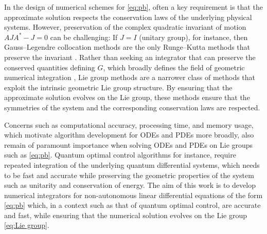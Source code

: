 \documentclass{article}
\begin{document}
%
In the design of numerical schemes for \eqref{eq:pb}, often a key requirement is that the approximate solution respects the conservation laws of the underlying physical systems.
%
However, preservation of the complex quadratic invariant of motion $AJA^\ast - J = 0$ can be challenging: If $J=I$ (unitary group), for instance, then Gauss--Legendre collocation methods are the only Runge--Kutta methods that preserve the invariant \cite{Dieci1994}. 
Rather than seeking an integrator that can preserve the conserved quantities defining $G$, which broadly defines the field of geometric numerical integration \cite{HLW:2006, BC:2017}, Lie group methods  \cite{IMNZ:2000} are a narrower class of methods that exploit the intrinsic geometric Lie group structure. By ensuring that the approximate solution evolves on the Lie group, these methods ensure that the symmetries of the system and the corresponding conservation laws are respected.

Concerns such as computational accuracy, processing time, and memory usage, which motivate algorithm development for ODEs and PDEs more broadly, also remain of paramount importance when solving ODEs and PDEs on Lie groups such as \eqref{eq:pb}. Quantum optimal control algorithms \cite{BTP1983, BCR2010, FP2021, GBCKKK2015, VRTGS2016} 
for instance,  require repeated integration of the underlying quantum differential systems, which needs to be fast and accurate while preserving the geometric properties of the system such as unitarity and conservation of energy. 
The aim of this work is to develop numerical integrators for non-autonomous linear differential equations of the form \eqref{eq:pb} which, in a context such as that of quantum optimal control, are accurate and fast, while ensuring that the numerical solution evolves on the Lie group \eqref{eq:Lie group}. 
\end{document}
